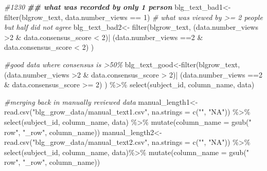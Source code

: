 \documentclass[
]{article}
\newenvironment{Shaded}{\begin{snugshade}}{\end{snugshade}}
\newcommand{\AttributeTok}[1]{\textcolor[rgb]{0.77,0.63,0.00}{#1}}
\newcommand{\CommentTok}[1]{\textcolor[rgb]{0.56,0.35,0.01}{\textit{#1}}}
\newcommand{\DecValTok}[1]{\textcolor[rgb]{0.00,0.00,0.81}{#1}}
\newcommand{\DocumentationTok}[1]{\textcolor[rgb]{0.56,0.35,0.01}{\textbf{\textit{#1}}}}
\newcommand{\FunctionTok}[1]{\textcolor[rgb]{0.00,0.00,0.00}{#1}}
\newcommand{\NormalTok}[1]{#1}
\newcommand{\OtherTok}[1]{\textcolor[rgb]{0.56,0.35,0.01}{#1}}
\newcommand{\SpecialCharTok}[1]{\textcolor[rgb]{0.00,0.00,0.00}{#1}}
\newcommand{\StringTok}[1]{\textcolor[rgb]{0.31,0.60,0.02}{#1}}
\begin{document}
\begin{Shaded}
\begin{Highlighting}[]
\CommentTok{\#1230 }
\DocumentationTok{\#\# what was recorded by only 1 person}
\NormalTok{blg\_text\_bad1}\OtherTok{\textless{}{-}} \FunctionTok{filter}\NormalTok{(blgrow\_text, data.number\_views }\SpecialCharTok{==} \DecValTok{1}\NormalTok{) }
\CommentTok{\# what was viewed by \textgreater{}= 2 people but half did not agree }
\NormalTok{blg\_text\_bad2}\OtherTok{\textless{}{-}} \FunctionTok{filter}\NormalTok{(blgrow\_text, (data.number\_views }\SpecialCharTok{\textgreater{}}\DecValTok{2} \SpecialCharTok{\&}\NormalTok{ data.consensus\_score }\SpecialCharTok{\textless{}} \DecValTok{2}\NormalTok{)}\SpecialCharTok{|}\NormalTok{ (data.number\_views }\SpecialCharTok{==}\DecValTok{2} \SpecialCharTok{\&}\NormalTok{ data.consensus\_score }\SpecialCharTok{\textless{}} \DecValTok{2}\NormalTok{) ) }

\CommentTok{\#good data where consensus is \textgreater{}50\% }
\NormalTok{blg\_text\_good}\OtherTok{\textless{}{-}}\FunctionTok{filter}\NormalTok{(blgrow\_text, (data.number\_views }\SpecialCharTok{\textgreater{}}\DecValTok{2} \SpecialCharTok{\&}\NormalTok{ data.consensus\_score }\SpecialCharTok{\textgreater{}} \DecValTok{2}\NormalTok{)}\SpecialCharTok{|}\NormalTok{ (data.number\_views }\SpecialCharTok{==}\DecValTok{2} \SpecialCharTok{\&}\NormalTok{ data.consensus\_score }\SpecialCharTok{\textgreater{}=} \DecValTok{2}\NormalTok{) ) }\SpecialCharTok{\%\textgreater{}\%}
\FunctionTok{select}\NormalTok{(subject\_id, column\_name, data)}

\CommentTok{\#merging back in manually reviewed data }
\NormalTok{manual\_length1}\OtherTok{\textless{}{-}}\FunctionTok{read.csv}\NormalTok{(}\StringTok{"blg\_grow\_data/manual\_text1.csv"}\NormalTok{, }\AttributeTok{na.strings =} \FunctionTok{c}\NormalTok{(}\StringTok{""}\NormalTok{, }\StringTok{"NA"}\NormalTok{)) }\SpecialCharTok{\%\textgreater{}\%}
  \FunctionTok{select}\NormalTok{(subject\_id, column\_name, data) }\SpecialCharTok{\%\textgreater{}\%}
  \FunctionTok{mutate}\NormalTok{(}\AttributeTok{column\_name =} \FunctionTok{gsub}\NormalTok{(}\StringTok{" row"}\NormalTok{, }\StringTok{"\_row"}\NormalTok{, column\_name))}
\NormalTok{manual\_length2}\OtherTok{\textless{}{-}}\FunctionTok{read.csv}\NormalTok{(}\StringTok{"blg\_grow\_data/manual\_text2.csv"}\NormalTok{, }\AttributeTok{na.strings =} \FunctionTok{c}\NormalTok{(}\StringTok{""}\NormalTok{, }\StringTok{"NA"}\NormalTok{)) }\SpecialCharTok{\%\textgreater{}\%}
  \FunctionTok{select}\NormalTok{(subject\_id, column\_name, data)}\SpecialCharTok{\%\textgreater{}\%}
  \FunctionTok{mutate}\NormalTok{(}\AttributeTok{column\_name =} \FunctionTok{gsub}\NormalTok{(}\StringTok{" row"}\NormalTok{, }\StringTok{"\_row"}\NormalTok{, column\_name))}


\end{Highlighting}
\end{Shaded}
\end{document}
